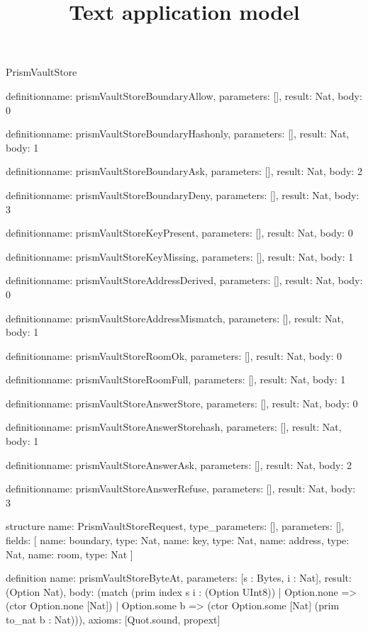 \begin{lexlean}{PrismVaultStore}
\title{Text application model}
\begin{semanticmodule}
definition{name: prismVaultStoreBoundaryAllow, parameters: [], result: Nat, body: 0}

definition{name: prismVaultStoreBoundaryHashonly, parameters: [], result: Nat, body: 1}

definition{name: prismVaultStoreBoundaryAsk, parameters: [], result: Nat, body: 2}

definition{name: prismVaultStoreBoundaryDeny, parameters: [], result: Nat, body: 3}

definition{name: prismVaultStoreKeyPresent, parameters: [], result: Nat, body: 0}

definition{name: prismVaultStoreKeyMissing, parameters: [], result: Nat, body: 1}

definition{name: prismVaultStoreAddressDerived, parameters: [], result: Nat, body: 0}

definition{name: prismVaultStoreAddressMismatch, parameters: [], result: Nat, body: 1}

definition{name: prismVaultStoreRoomOk, parameters: [], result: Nat, body: 0}

definition{name: prismVaultStoreRoomFull, parameters: [], result: Nat, body: 1}

definition{name: prismVaultStoreAnswerStore, parameters: [], result: Nat, body: 0}

definition{name: prismVaultStoreAnswerStorehash, parameters: [], result: Nat, body: 1}

definition{name: prismVaultStoreAnswerAsk, parameters: [], result: Nat, body: 2}

definition{name: prismVaultStoreAnswerRefuse, parameters: [], result: Nat, body: 3}

structure{
  name: PrismVaultStoreRequest,
  type_parameters: [],
  parameters: [],
  fields: [
    {name: boundary, type: Nat},
    {name: key, type: Nat},
    {name: address, type: Nat},
    {name: room, type: Nat}
  ]
}

definition{
  name: prismVaultStoreByteAt,
  parameters: [s : Bytes, i : Nat],
  result: (Option Nat),
  body: (match (prim index s i : (Option UInt8))
    | Option.none => (ctor Option.none [Nat])
    | Option.some b => (ctor Option.some [Nat] (prim to_nat b : Nat))),
  axioms: [Quot.sound, propext]
}


\end{semanticmodule}
\end{lexlean}
